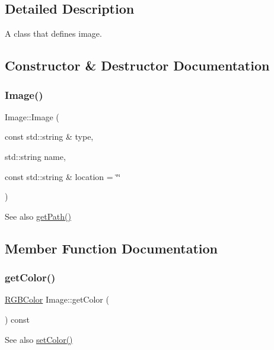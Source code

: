 \subsection{Detailed Description}
A class that defines image. 

\subsection{Constructor \& Destructor Documentation}
\mbox{\label{class_image_a756ad99e518df8f5bd5c01e564605fa9}} 
\subsubsection{\texorpdfstring{Image()}{Image()}}
{\footnotesize\ttfamily Image\+::\+Image (\begin{DoxyParamCaption}\item[{const std\+::string \&}]{type,  }\item[{std\+::string}]{name,  }\item[{const std\+::string \&}]{location = {\ttfamily \char`\"{}\char`\"{}} }\end{DoxyParamCaption})}

\begin{DoxySeeAlso}{See also}
\mbox{\hyperlink{class_image_a1be7f4ed8dae0ce591ac395484ab6fdb}{get\+Path()}} 
\end{DoxySeeAlso}


\subsection{Member Function Documentation}
\mbox{\label{class_image_aec79ea5d2bc5177e1c7ad43fdc19feca}} 
\subsubsection{\texorpdfstring{get\+Color()}{getColor()}}
{\footnotesize\ttfamily \mbox{\hyperlink{class_r_g_b_color}{R\+G\+B\+Color}} Image\+::get\+Color (\begin{DoxyParamCaption}{ }\end{DoxyParamCaption}) const}

\begin{DoxySeeAlso}{See also}
\mbox{\hyperlink{class_image_a642f5f8c346c881c7d7cbbd2eb3de7ca}{set\+Color()}} 
\end{DoxySeeAlso}
\mbox{\label{class_image_a1cd7587f88b6932b5269051d1ba08ff9}} 
